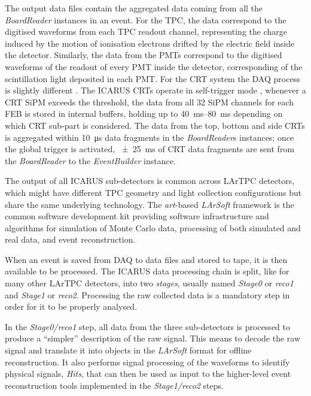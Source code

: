 The output data files contain the aggregated data coming from all the \emph{BoardReader} instances in an event. For the TPC, the data correspond to the digitised waveforms from each TPC readout channel, representing the charge induced by the motion of ionisation electrons drifted by the electric field inside the detector. Similarly, the data from the PMTs correspond to the digitised waveforms of the readout of every PMT inside the detector, corresponding of the scintillation light deposited in each PMT. For the CRT system the DAQ process is slightly different \cite{ICARUS:2025rdw,Poppi:2023zmp,Poppi:2022vhg}. The ICARUS CRTs operate in self-trigger mode \cite{arteroponsStudyReconstructionNuMuCC, ICARUS:2025rdw}, whenever a CRT SiPM exceeds the threshold, the data from all 32 SiPM channels for each FEB is stored in internal buffers, holding up to \qtyrange{40}{80}{\ms} depending on which CRT sub-part is considered. The data from the top, bottom and side CRTs is aggregated within \SI{10}{\us} data fragments in the \emph{BoardReader}s instances; once the global trigger is activated, \SI{+-25}{\ms} of CRT data fragments are sent from the \emph{BoardReader} to the \emph{EventBuilder} instance. 

The output of all ICARUS sub-detectors is common across LArTPC detectors, which might have different TPC geometry and light collection configurations but share the same underlying technology. The \emph{art}-based \emph{LArSoft} framework \cite{Church:2013hea,Snider:2017wjd,Pordes:2017BL} is the common software development kit providing software infrastructure and algorithms for simulation of Monte Carlo data, processing of both simulated and real data, and event reconstruction. 

When an event is saved from DAQ to data files and stored to tape, it is then available to be processed. The ICARUS data processing chain is split, like for many other LArTPC detectors, into two \emph{stages}, usually named \emph{Stage0} or \emph{reco1} and \emph{Stage1} or \emph{reco2}. Processing the raw collected data is a mandatory step in order for it to be properly analysed. 

In the \emph{Stage0/reco1} step, all data  from the three sub-detectors is processed to produce a ``simpler'' description of the raw signal. This means to decode the raw signal and translate it into objects in the \emph{LArSoft} format for offline reconstruction. It also performs signal processing of the waveforms to identify physical signals, \emph{Hits}, that can then be used as input to the higher-level event reconstruction tools implemented in the \emph{Stage1/reco2} steps. 

